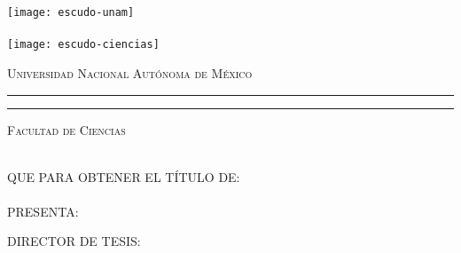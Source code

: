 \hskip-1.5cm
\begin{minipage}[c][10cm][s]{3cm}
  \begin{center}
    \texttt{[image: escudo-unam]}\\[10pt]
    \hskip2pt\vrule width2pt height13cm\hskip1mm
    \vrule width1pt height13cm\\[10pt]
    \texttt{[image: escudo-ciencias]}
  \end{center}
\end{minipage}\quad
\begin{minipage}[c][9.5cm][s]{10cm}
  \begin{center}
    {\large \scshape Universidad Nacional Aut\'onoma de M\'exico}
    \vspace{.3cm}
    \hrule height2pt
    \vspace{.1cm}
    \hrule height1pt
    \vspace{.3cm}
    {\scshape Facultad de Ciencias}

    \vspace{3cm}

    {\Large \eltitulo}

    \vspace{3cm}

    \\[8pt]
    QUE PARA OBTENER EL T\'ITULO DE:\\[3pt]
    \mbox{}\lacarrera\\[13pt]
    PRESENTA:\\[3pt]
    \elnombre

    \vspace{2cm}

    {\small DIRECTOR DE TESIS:\\ \eldirector}

    \vspace{2cm}

    \lafecha

  \end{center}
\end{minipage}
